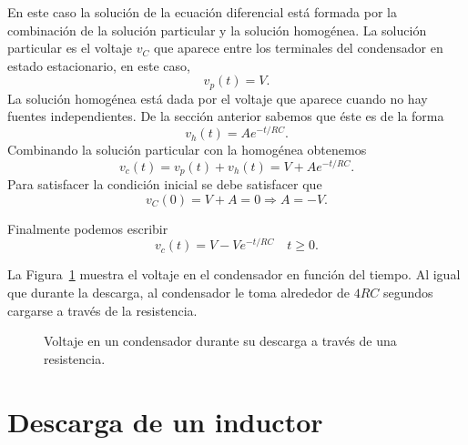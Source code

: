 \documentclass[paper=letter, fontsize=11pt]{scrartcl}
\begin{document}
En este caso la solución de la ecuación diferencial está formada por la
combinación de la solución particular y la solución homogénea. La solución
particular es el voltaje $v_C$ que aparece entre los terminales del condensador
en estado estacionario, en este caso,
%
\begin{equation}
  v_p(t) = V.
\end{equation}
%
La solución homogénea está dada por el voltaje que aparece cuando no hay
fuentes independientes. De la sección anterior sabemos que éste es de la forma
%
\begin{equation}
  v_h(t) = Ae^{-t/RC}.
\end{equation}
%
Combinando la solución particular con la homogénea obtenemos
%
\begin{equation}
  v_c(t) = v_p(t) + v_h(t) = V + A e^{-t/RC}.
\end{equation}
%
Para satisfacer la condición inicial se debe satisfacer que
%
\begin{equation}
  v_C(0) = V + A = 0 \Rightarrow A = -V.
\end{equation}

Finalmente podemos escribir
%
\begin{equation}
  v_c(t) = V - Ve^{-t/RC} \quad t \geq 0.
\end{equation}

La Figura~\ref{fig:Ccarg} muestra el voltaje en el condensador en función del
tiempo. Al igual que durante la descarga, al condensador le toma alrededor de
$4RC$ segundos cargarse a través de la resistencia.

\begin{figure}[h!]
  \centering
  \caption{Voltaje en un condensador durante su descarga a través de una
    resistencia. }
\label{fig:Ccarg}
\end{figure}

\section{Descarga de un inductor}
\end{document}
